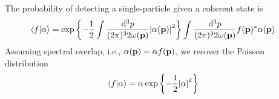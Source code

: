 The probability of detecting a single-particle given a coherent state is
\begin{equation}
	\begin{split}
		\braket{f}{\alpha}
		&=
		\exp\left\{
			-
			\frac{1}{2}
			\int\frac{\dd[3]{p}}{(2\pi)^32\omega(\vb{p})}
			\abs{\alpha(\vb{p})}^2
		\right\}
		\int\frac{\dd[3]{p}}{(2\pi)^32\omega(\vb{p})}
		f(\vb{p})^*
		\alpha(\vb{p})
	\end{split}
\end{equation}
Assuming spectral overlap, i.e., $\alpha(\vb{p})=\alpha f(\vb{p})$, we recover the Poisson distribution
\begin{equation}
	\begin{split}
		\braket{f}{\alpha}
		&=
		\alpha
		\exp\left\{
			-
			\frac{1}{2}
			\abs{\alpha}^2
		\right\}
	\end{split}
\end{equation}

